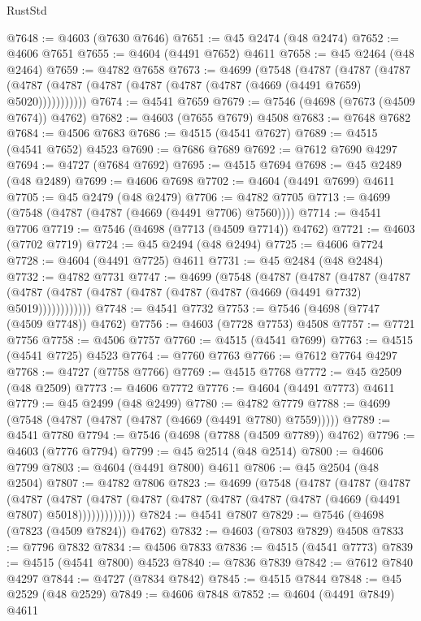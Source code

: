 \begin{lexlean}{RustStd}
\begin{coremodule}
@7648 := @4603 (@7630 @7646)
@7651 := @45 @2474 (@48 @2474)
@7652 := @4606 @7651
@7655 := @4604 (@4491 @7652) @4611
@7658 := @45 @2464 (@48 @2464)
@7659 := @4782 @7658
@7673 := @4699
    (@7548
      (@4787
        (@4787
          (@4787 (@4787 (@4787 (@4787 (@4787 (@4787 (@4787 (@4669 (@4491 @7659) @5020)))))))))))
@7674 := @4541 @7659
@7679 := @7546 (@4698 (@7673 (@4509 @7674)) @4762)
@7682 := @4603 (@7655 @7679) @4508
@7683 := @7648 @7682
@7684 := @4506 @7683
@7686 := @4515 (@4541 @7627)
@7689 := @4515 (@4541 @7652) @4523
@7690 := @7686 @7689
@7692 := @7612 @7690 @4297
@7694 := @4727 (@7684 @7692)
@7695 := @4515 @7694
@7698 := @45 @2489 (@48 @2489)
@7699 := @4606 @7698
@7702 := @4604 (@4491 @7699) @4611
@7705 := @45 @2479 (@48 @2479)
@7706 := @4782 @7705
@7713 := @4699 (@7548 (@4787 (@4787 (@4669 (@4491 @7706) @7560))))
@7714 := @4541 @7706
@7719 := @7546 (@4698 (@7713 (@4509 @7714)) @4762)
@7721 := @4603 (@7702 @7719)
@7724 := @45 @2494 (@48 @2494)
@7725 := @4606 @7724
@7728 := @4604 (@4491 @7725) @4611
@7731 := @45 @2484 (@48 @2484)
@7732 := @4782 @7731
@7747 := @4699
    (@7548
      (@4787
        (@4787
          (@4787
            (@4787 (@4787 (@4787 (@4787 (@4787 (@4787 (@4787 (@4669 (@4491 @7732) @5019))))))))))))
@7748 := @4541 @7732
@7753 := @7546 (@4698 (@7747 (@4509 @7748)) @4762)
@7756 := @4603 (@7728 @7753) @4508
@7757 := @7721 @7756
@7758 := @4506 @7757
@7760 := @4515 (@4541 @7699)
@7763 := @4515 (@4541 @7725) @4523
@7764 := @7760 @7763
@7766 := @7612 @7764 @4297
@7768 := @4727 (@7758 @7766)
@7769 := @4515 @7768
@7772 := @45 @2509 (@48 @2509)
@7773 := @4606 @7772
@7776 := @4604 (@4491 @7773) @4611
@7779 := @45 @2499 (@48 @2499)
@7780 := @4782 @7779
@7788 := @4699 (@7548 (@4787 (@4787 (@4787 (@4669 (@4491 @7780) @7559)))))
@7789 := @4541 @7780
@7794 := @7546 (@4698 (@7788 (@4509 @7789)) @4762)
@7796 := @4603 (@7776 @7794)
@7799 := @45 @2514 (@48 @2514)
@7800 := @4606 @7799
@7803 := @4604 (@4491 @7800) @4611
@7806 := @45 @2504 (@48 @2504)
@7807 := @4782 @7806
@7823 := @4699
    (@7548
      (@4787
        (@4787
          (@4787
            (@4787
              (@4787
                (@4787 (@4787 (@4787 (@4787 (@4787 (@4787 (@4669 (@4491 @7807) @5018)))))))))))))
@7824 := @4541 @7807
@7829 := @7546 (@4698 (@7823 (@4509 @7824)) @4762)
@7832 := @4603 (@7803 @7829) @4508
@7833 := @7796 @7832
@7834 := @4506 @7833
@7836 := @4515 (@4541 @7773)
@7839 := @4515 (@4541 @7800) @4523
@7840 := @7836 @7839
@7842 := @7612 @7840 @4297
@7844 := @4727 (@7834 @7842)
@7845 := @4515 @7844
@7848 := @45 @2529 (@48 @2529)
@7849 := @4606 @7848
@7852 := @4604 (@4491 @7849) @4611

\end{coremodule}
\end{lexlean}
